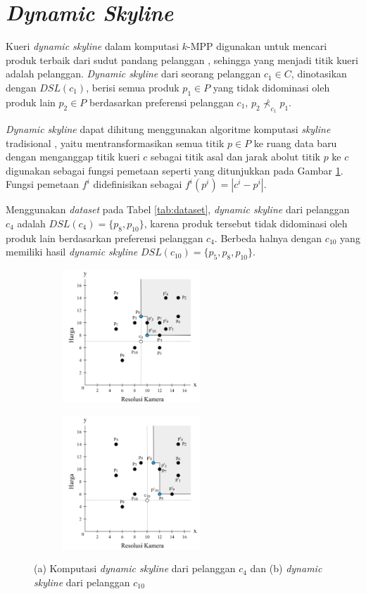 \section{\textit{Dynamic Skyline}}
\tab Kueri \textit{dynamic skyline} dalam komputasi $k$-MPP digunakan untuk mencari produk terbaik dari sudut pandang pelanggan \cite{kmpp}, sehingga yang menjadi titik kueri adalah pelanggan. \textit{Dynamic skyline} \cite{dynamic-skyline} dari seorang pelanggan $c_1 \in C$, dinotasikan dengan $DSL(c_1)$, berisi semua produk $p_1 \in P$ yang tidak didominasi oleh produk lain $p_2 \in P$ berdasarkan preferensi pelanggan $c_1$, $p_2 \nprec_{c_1} p_1$.

\textit{Dynamic skyline} dapat dihitung menggunakan algoritme komputasi \textit{skyline} tradisional \cite{skyline}, yaitu mentransformasikan semua titik $p \in P$ ke ruang data baru dengan menganggap titik kueri $c$ sebagai titik asal dan jarak abolut titik $p$ ke $c$ digunakan sebagai fungsi pemetaan seperti yang ditunjukkan pada Gambar \ref{fig:dsl}. Fungsi pemetaan $f^i$ didefinisikan sebagai $f^i (p^i) = |c^i-p^i|$.

Menggunakan \textit{dataset} pada Tabel \ref{tab:dataset}, \textit{dynamic skyline} dari pelanggan $c_4$ adalah $DSL(c_4) = \{p_8, p_{10}\}$, karena produk tersebut tidak didominasi oleh produk lain berdasarkan preferensi pelanggan $c_4$. Berbeda halnya dengan $c_{10}$ yang memiliki hasil \textit{dynamic skyline} $DSL(c_{10}) = \{p_5, p_8, p_{10}\}$.

\begin{figure}[h]
	\centering
	\begin{subfigure}{.5\textwidth}
		\centering
		\includegraphics[height=5cm]{assets/img/bab2/dsl-1.png}
		\caption{}
	\end{subfigure}%
	\begin{subfigure}{.5\textwidth}
		\centering
		\includegraphics[height=5cm]{assets/img/bab2/dsl-2.png}
		\caption{}
	\end{subfigure}
	\caption{(a) Komputasi \textit{dynamic skyline} dari pelanggan $c_{4}$ dan (b) \textit{dynamic skyline} dari pelanggan $c_{10}$}
	\label{fig:dsl}
\end{figure}

